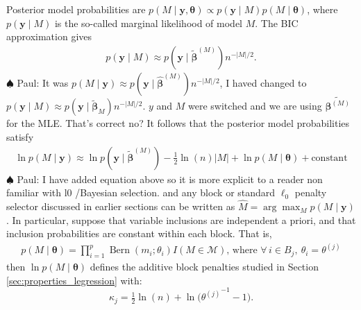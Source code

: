 \documentclass[aos]{imsart}
\theoremstyle{plain}
\newcommand{\paul}[1]{{\small{\color{green} \sf $\spadesuit$ Paul: #1}}}
\newcommand{\M}{\mathcal{M}}
\newcommand{\bs}{\boldsymbol}
\begin{document}
Posterior model probabilities are $p(M \mid \bs y, \bs \theta) \propto p(\bs y \mid M) p(M \mid \bs \theta)$, where $p(\bs y \mid M)$ is the so-called marginal likelihood of model $M$. The BIC approximation \citep{BIC} gives
\begin{align*}
 p( \bs y  \mid M)\approx p(\bs y \mid \tilde{\bs \beta}^{(M)})n^{-|M|/2}.
\end{align*}
\paul{It was $p( M \mid \bs y ) \approx p(\bs y \mid \hat{\bs \beta}^{(M)})n^{-|M|/2}$, I haved changed to $p( \bs y  \mid M) \approx p(\bs y \mid \tilde{\bs \beta}_M)n^{-|M|/2}$. $y$ and $M$ were switched and we are using $\tilde{\bs \beta^{(M)}}$ for the MLE. That's correct no?}
It follows that the posterior model probabilities satisfy
\begin{align*}
\ln p(M \mid\bs y) \approx \ln p(\bs y \mid \tilde{\bs \beta}^{(M)}) - \frac{1}{2}\ln(n)|M| + \ln p(M\mid\bs \theta) + \text{constant}
\end{align*}
\paul{I have added equation above so it is more explicit to a reader non familiar with l0 /Bayesian selection.}
and any block or standard $\ell_0$ penalty selector discussed in earlier sections can be written as $\hat{M}= \arg\max_M p(M \mid \bs y)$. 
In particular, suppose that variable inclusions are independent a priori, and that inclusion probabilities are constant within each block. That is,
\begin{align} \label{eq:block_modelprior}
p( M \mid \boldsymbol{\theta})=
        \prod_{i=1}^p \operatorname{Bern}\left(m_i ; \theta_i\right) I(M \in \M) \mbox{, where } \forall \, i\in B_j, \: \theta_i=\theta^{(j)}
\end{align}
then $\ln p(M \mid \bs \theta)$ defines the additive block penalties studied in Section \ref{sec:properties_legression} with:
\begin{equation}\label{eq:blockpenpriorinclu}
    \kappa_j=\tfrac{1}{2}\ln(n)+\ln\big({\theta^{(j)}}^{-1}-1\big).
\end{equation}
\end{document}

